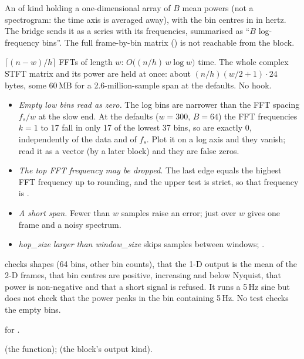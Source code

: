 An  of kind  holding a one-dimensional array of $B$ mean powers
(not a spectrogram: the time axis is averaged away), with the bin centres in
 in hertz. The bridge sends it as a series with its frequencies,
summarised as ``$B$ log-frequency bins''. The full frame-by-bin matrix
() is not reachable from the block.

$\lceil (n-w)/h\rceil$ FFTs of length $w$: $O\big((n/h)\, w\log w\big)$ time. The whole
complex STFT matrix and its power are held at once: about $(n/h)(w/2+1)\cdot 24$ bytes,
some 60\,MB for a 2.6-million-sample span at the defaults. No  hook.

\begin{itemize}
\item \emph{Empty low bins read as zero.} The log bins are narrower than the FFT spacing
  $f_s/w$ at the slow end. At the defaults ($w = 300$, $B = 64$) the FFT frequencies $k=1$
  to 17 fall in only 17 of the lowest 37 bins, so  are
  exactly 0, independently of the data and of $f_s$. Plot it on a log axis and they vanish;
  read it as a vector (by a later block) and they are false zeros.
\item \emph{The top FFT frequency may be dropped.} The last edge equals the highest FFT
  frequency up to rounding, and the upper test is strict, so that frequency is
  .
\item \emph{A short span.} Fewer than $w$ samples raise an error; just over $w$ gives one
  frame and a noisy spectrum.
\item \emph{hop\_size larger than window\_size} skips samples between windows;
  .
\end{itemize}

 checks shapes (64 bins, other bin counts), that the
1-D output is the mean of the 2-D frames, that bin centres are positive, increasing and below
Nyquist, that power is non-negative and that a short signal is refused. It runs a 5\,Hz
sine but does not check that the power peaks in the bin containing 5\,Hz. No test checks
the empty bins.

\citet{virtanen2020scipy} for .

 (the function); 
(the block's output kind).
